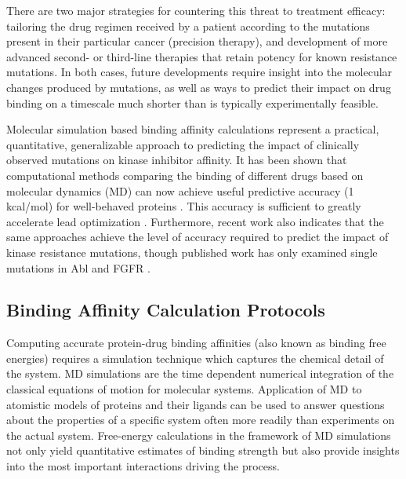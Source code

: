 \documentclass[conference]{IEEEtran}
\begin{document}
There are two major strategies for countering this threat to treatment efficacy: tailoring the drug regimen received by a patient according to the mutations present in their particular cancer (precision therapy), and development of more advanced second- or third-line therapies that retain potency for known resistance mutations. In both cases, future developments require insight into the molecular changes produced by mutations, as well as ways to predict their impact on drug binding on a timescale much shorter than is typically experimentally feasible. 

Molecular simulation based binding affinity calculations represent a practical, quantitative, generalizable approach to predicting the impact of clinically observed mutations on kinase inhibitor affinity. It has been shown that computational methods comparing the binding of different drugs based on molecular dynamics (MD) can now achieve useful predictive accuracy (1 kcal/mol) for well-behaved proteins \cite{shirts-mobley-chodera:2007:annu-rep-comput-chem:prime-time,chodera:curr-opin-struct-biol:2011:drug-discovery,abel:jacs:2015:fep-plus}. This accuracy is sufficient to greatly accelerate lead optimization \cite{shirts-mobley-brown:2009:sbdd}. Furthermore, recent work also indicates that the same approaches achieve the level of accuracy required to predict the impact of kinase resistance mutations, though published work has only examined single mutations in Abl and FGFR \cite{mondal:jacs:2016:imatinib-gatekeeper, Bunney2015}.

\subsection{Binding Affinity Calculation Protocols}\label{sec:bac}

Computing accurate protein-drug binding affinities (also known as binding free energies) requires a simulation technique which captures the chemical detail of the system. MD simulations are the time dependent numerical integration of the classical equations of motion for molecular systems. Application of MD to atomistic models of proteins and their ligands can be used to answer questions about the properties of a specific system often more readily than experiments on the actual system. Free-energy calculations in the framework of MD simulations not only yield quantitative estimates of binding strength but also provide insights into the most important interactions driving the process.
\end{document}
